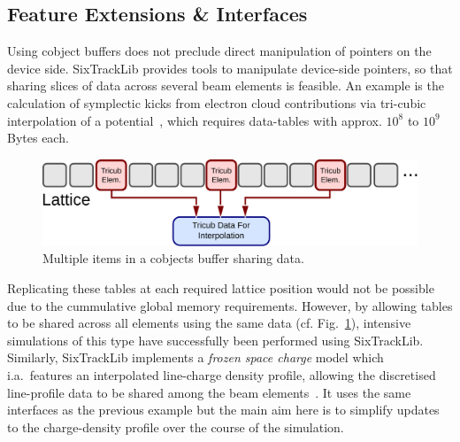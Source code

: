 \documentclass[a4paper,
               refpage,       %
               keeplastbox,   %
               ]{jacow}
\begin{document}
\subsection{Feature Extensions \& Interfaces}
Using cobject buffers does not preclude direct manipulation of pointers on the device side. SixTrackLib provides tools to manipulate device-side pointers, so that sharing slices of data across several beam elements is feasible. An example is the calculation of symplectic kicks from electron cloud contributions via tri-cubic interpolation of a potential~\cite{kparaschou-2020}, which requires data-tables with approx. $10^8$ to $10^9$ Bytes each. 
\begin{figure}[!hbt]
    \centering
    \includegraphics*[width=.9\columnwidth]{fig_be_external_data}
    \caption{Multiple items in a cobjects buffer sharing data.}
    \label{fig:be_external_data}
\end{figure}
Replicating these tables at each required lattice position would not be possible due to the cummulative global memory requirements. However, by allowing tables to be shared across all elements using the same data (cf. Fig.~\ref{fig:be_external_data}), intensive simulations of this type have successfully been performed using SixTrackLib.
Similarly, SixTrackLib implements a \textit{frozen space charge} model which i.a.\ features an interpolated line-charge density profile, allowing the discretised line-profile data to be shared among the beam elements~\cite{aoeftiger-2021}. It uses the same interfaces as the previous example but the main aim here is to simplify updates to the charge-density profile over the course of the simulation.
\end{document}
